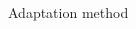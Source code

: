 \documentclass[pdf,dvipsnames,aspectratio=169]{beamer}
\begin{document}
\begin{frame}[c]{Adaptation method}
\begin{columns}[t]
\begin{column}{0.45\textwidth}
\begin{figure}

\end{figure}
\end{column}
\end{columns}
\end{frame}
\end{document}
